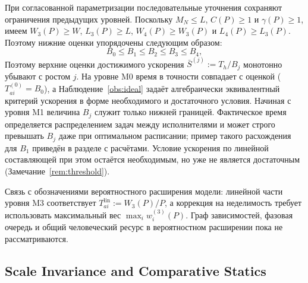 \documentclass[12pt,a4paper]{article}
\theoremstyle{definition}
\begin{document}
При согласованной параметризации последовательные уточнения сохраняют
ограничения предыдущих уровней. Поскольку $M_N\le L$, $C(P)\ge1$ и
$\gamma(P)\ge1$, имеем $W_3(P)\ge W$, $L_3(P)\ge L$,
$W_4(P)\ge W_3(P)$ и $L_4(P)\ge L_3(P)$. Поэтому нижние оценки упорядочены
следующим образом:
\[
  B_0 \le B_1 \le B_2 \le B_3 \le B_4,
\]
Поэтому верхние оценки достижимого ускорения $\bar S^{(j)} := T_h / B_j$ монотонно убывают с ростом $j$. На уровне M0 время в точности совпадает с оценкой ($T_{ai}^{(0)} = B_0$), а Наблюдение~\ref{obs:ideal} задаёт алгебраически эквивалентный критерий ускорения в форме необходимого и достаточного условия. Начиная с уровня M1 величина $B_j$ служит только нижней границей. Фактическое время определяется распределением задач между исполнителями и может строго превышать $B_j$ даже при оптимальном расписании; пример такого расхождения для $B_1$ приведён в разделе с расчётами. Условие ускорения по линейной составляющей при этом остаётся необходимым, но уже не является достаточным (Замечание~\ref{rem:threshold}).

Связь с обозначениями вероятностного расширения модели: линейной части уровня M3 соответствует $T_{ai}^{\mathrm{lin}}:=W_3(P)/P$, а коррекция на неделимость требует использовать максимальный вес $\max_i w_i^{(3)}(P)$. Граф зависимостей, фазовая очередь и общий человеческий ресурс в вероятностном расширении пока не рассматриваются.

\subsection{Scale Invariance and Comparative Statics}
\end{document}
